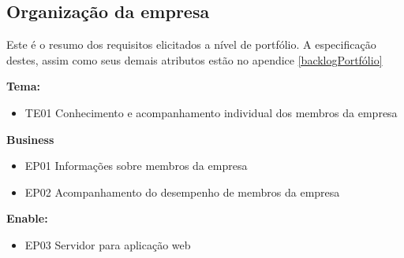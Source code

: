 \subsection{Organização da empresa}
Este é o resumo dos requisitos elicitados a nível de portfólio. A especificação destes, assim como seus demais atributos estão no apendice \ref{backlogPortfólio}

\textbf{Tema:}
\begin{itemize}
\item {TE01 Conhecimento e acompanhamento individual dos membros da empresa}
\end{itemize}

\textbf{Business}
\begin{itemize}
\item {EP01 Informações sobre membros da empresa}
\item {EP02 Acompanhamento do desempenho de membros da empresa}
\end{itemize}

\textbf{Enable:}
\begin{itemize}
\item {EP03 Servidor para aplicação web}
\end{itemize}


